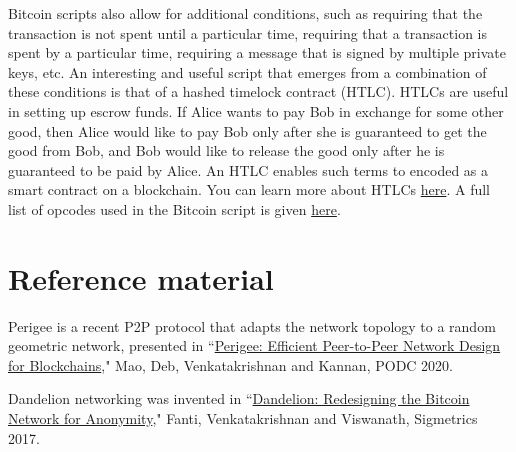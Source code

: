 \documentclass{article}
\begin{document}
Bitcoin scripts also allow for additional conditions, such as requiring that the transaction is not spent until a particular time, requiring that a transaction is spent by a particular time, requiring a message that is signed by multiple private keys, etc.
An interesting and useful script that emerges from a combination of these conditions is that of a hashed timelock contract (HTLC). HTLCs are useful in setting up escrow funds. If Alice wants to pay Bob in exchange for some other good, then Alice would like to pay Bob only after she is guaranteed to get the good from Bob, and Bob would like to release the good only after he is guaranteed to be paid by Alice. An HTLC enables such terms to encoded as a smart contract on a blockchain. You can learn more about HTLCs \href{https://www.investopedia.com/terms/h/hashed-timelock-contract.asp}{here}. A full list of opcodes used in the Bitcoin script is given \href{https://en.bitcoin.it/wiki/Script}{here}.

\section*{Reference material}

{\sf Perigee} is a recent P2P protocol that adapts the network topology to a random geometric network, presented in ``\href{https://dl.acm.org/doi/abs/10.1145/3382734.3405704}{Perigee: Efficient Peer-to-Peer Network Design for Blockchains}," 
Mao, Deb, Venkatakrishnan and Kannan, PODC 2020. %

{\sf Dandelion} networking was invented in ``\href{https://dl.acm.org/doi/abs/10.1145/3084459}{Dandelion: Redesigning the Bitcoin Network for Anonymity}," Fanti, Venkatakrishnan and Viswanath, Sigmetrics 2017. 



\end{document}
